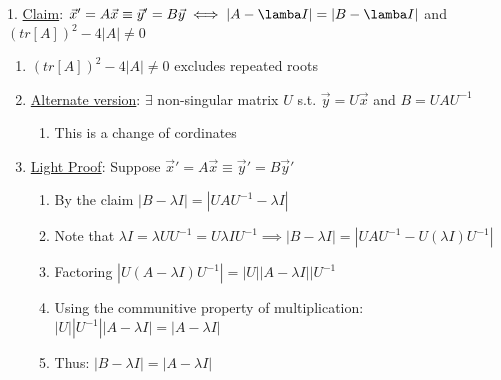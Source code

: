 \documentclass[11pt]{article}
\begin{document}
    1. \underline{Claim}: $\vec{x}' = A\vec{x} \equiv \vec{y}' = B\vec{y}
       \iff |A-\lamba I| = |B-\lamba I|$ and $(tr[A])^2 -4|A|
       \neq 0$
\begin{enumerate}
\item $(tr[A])^2 -4|A| \neq 0$ excludes repeated roots
\item \underline{Alternate version}: $\exists$ non-singular matrix $U$ s.t. $\vec{y}=U\vec{x}$ and $B = UAU^{-1}$

\begin{enumerate}
\item This is a change of cordinates
\end{enumerate}

\item \underline{Light Proof}: Suppose $\vec{x}' = A\vec{x} \equiv \vec{y}' = B\vec{y}'$

\begin{enumerate}
\item By the claim $|B-\lambda I| = |UAU^{-1} - \lambda I|$
\item Note that $\lambda I = \lambda U U^{-1} = U\lambda I U^{-1} \implies |B -
          \lambda I| = |UAU^{-1} - U(\lambda I)U^{-1} |$
\item Factoring $|U(A-\lambda I)U^{-1}| = |U| |A-\lambda I||U^{-1}$
\item Using the communitive property of
          multiplication: $|U||U^{-1}||A-\lambda I| = |A-\lambda I|$
\item Thus: $|B - \lambda I| = |A - \lambda I|$
\end{enumerate}

\end{enumerate}
\end{document}
